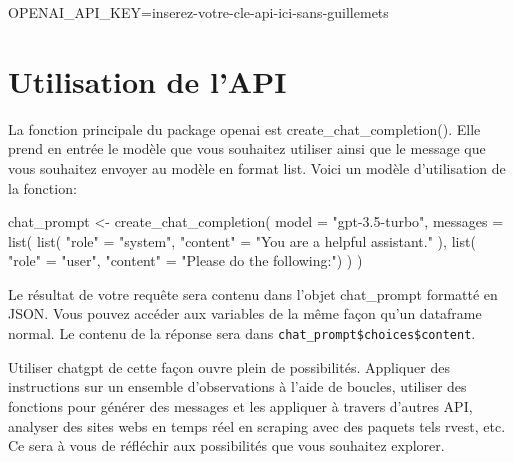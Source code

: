 \documentclass[
  letterpaper,
]{scrbook}
\newenvironment{Shaded}{\begin{snugshade}}{\end{snugshade}}
\newcommand{\AttributeTok}[1]{\textcolor[rgb]{0.40,0.45,0.13}{#1}}
\newcommand{\FunctionTok}[1]{\textcolor[rgb]{0.28,0.35,0.67}{#1}}
\newcommand{\NormalTok}[1]{\textcolor[rgb]{0.00,0.23,0.31}{#1}}
\newcommand{\OtherTok}[1]{\textcolor[rgb]{0.00,0.23,0.31}{#1}}
\newcommand{\SpecialCharTok}[1]{\textcolor[rgb]{0.37,0.37,0.37}{#1}}
\newcommand{\StringTok}[1]{\textcolor[rgb]{0.13,0.47,0.30}{#1}}
\begin{document}
\begin{Shaded}
\begin{Highlighting}[]
\NormalTok{OPENAI\_API\_KEY}\OtherTok{=}\NormalTok{inserez}\SpecialCharTok{{-}}\NormalTok{votre}\SpecialCharTok{{-}}\NormalTok{cle}\SpecialCharTok{{-}}\NormalTok{api}\SpecialCharTok{{-}}\NormalTok{ici}\SpecialCharTok{{-}}\NormalTok{sans}\SpecialCharTok{{-}}\NormalTok{guillemets}
\end{Highlighting}
\end{Shaded}

\hypertarget{utilisation-de-lapi}{%
\section{Utilisation de l'API}\label{utilisation-de-lapi}}

La fonction principale du package openai est create\_chat\_completion().
Elle prend en entrée le modèle que vous souhaitez utiliser ainsi que le
message que vous souhaitez envoyer au modèle en format list. Voici un
modèle d'utilisation de la fonction:

\begin{Shaded}
\begin{Highlighting}[]
\NormalTok{chat\_prompt }\OtherTok{\textless{}{-}} \FunctionTok{create\_chat\_completion}\NormalTok{(}
    \AttributeTok{model =} \StringTok{"gpt{-}3.5{-}turbo"}\NormalTok{,}
    \AttributeTok{messages =} \FunctionTok{list}\NormalTok{(}
        \FunctionTok{list}\NormalTok{(}
            \StringTok{"role"} \OtherTok{=} \StringTok{"system"}\NormalTok{,}
            \StringTok{"content"} \OtherTok{=} \StringTok{"You are a helpful assistant."}
\NormalTok{        ),}
        \FunctionTok{list}\NormalTok{(}
            \StringTok{"role"} \OtherTok{=} \StringTok{"user"}\NormalTok{,}
            \StringTok{"content"} \OtherTok{=} \StringTok{"Please do the following:"}\NormalTok{)}
\NormalTok{        )}
\NormalTok{    )}
\end{Highlighting}
\end{Shaded}

Le résultat de votre requête sera contenu dans l'objet chat\_prompt
formatté en JSON. Vous pouvez accéder aux variables de la même façon
qu'un dataframe normal. Le contenu de la réponse sera dans
\texttt{chat\_prompt\$choices\$content}.

Utiliser chatgpt de cette façon ouvre plein de possibilités. Appliquer
des instructions sur un ensemble d'observations à l'aide de boucles,
utiliser des fonctions pour générer des messages et les appliquer à
travers d'autres API, analyser des sites webs en temps réel en scraping
avec des paquets tels rvest, etc. Ce sera à vous de réfléchir aux
possibilités que vous souhaitez explorer.
\end{document}
